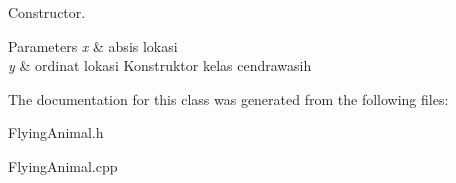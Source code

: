 Constructor. 


\begin{DoxyParams}{Parameters}
{\em x} & absis lokasi \\
\hline
{\em y} & ordinat lokasi Konstruktor kelas cendrawasih \\
\hline
\end{DoxyParams}


The documentation for this class was generated from the following files\+:\begin{DoxyCompactItemize}
\item 
Flying\+Animal.\+h\item 
Flying\+Animal.\+cpp\end{DoxyCompactItemize}
